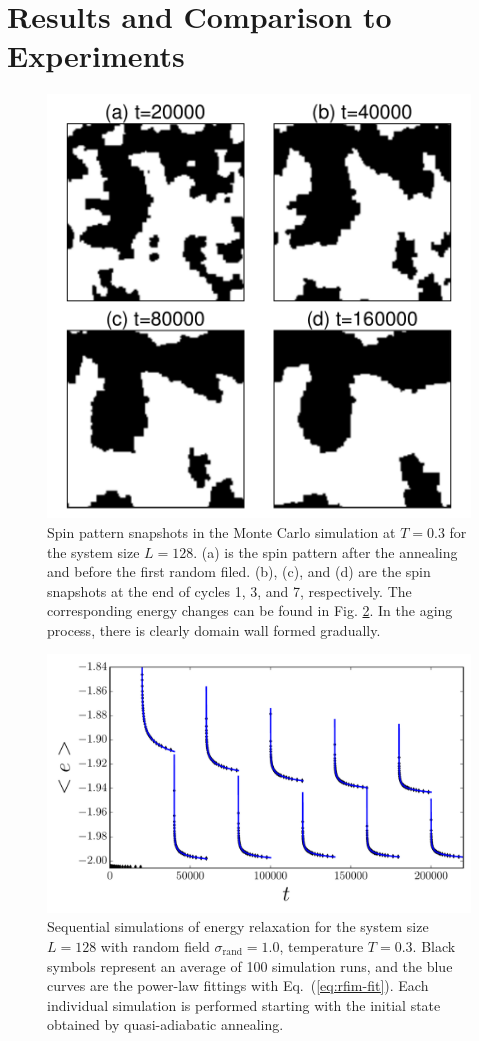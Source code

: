\section{Results and Comparison to Experiments}
\label{sec:rfim-results}
\begin{figure}
\centering \includegraphics[width=0.8\columnwidth]{Chapter-4/spin_plot1_Norf}
\caption{Spin pattern snapshots in the Monte Carlo simulation at $T=0.3$ for the system size $L=128$. (a) is the spin pattern after the annealing and before the first random filed. (b), (c), and (d) are the spin snapshots at the end of cycles 1, 3, and 7, respectively. The corresponding energy changes can be found in Fig. \ref{fig:rfim-Es1}. In the aging process, there is clearly domain wall formed gradually. }
\label{fig:rfim-spinshots}
\end{figure}

\begin{figure}
\centering \includegraphics[width=0.8\columnwidth]{Chapter-4/Energy_simultion_fitted_10cycles_T03} 
\caption{Sequential simulations of energy relaxation for the system size $L=128$ with
random field $\sigma_{\text{rand}}=1.0$, temperature $T=0.3$. Black symbols represent an average of 100 simulation runs, and the blue curves are the power-law fittings with Eq.~(\ref{eq:rfim-fit}). Each individual simulation is performed starting with the initial state obtained by quasi-adiabatic annealing.}
\label{fig:rfim-Es1} 
\end{figure}

